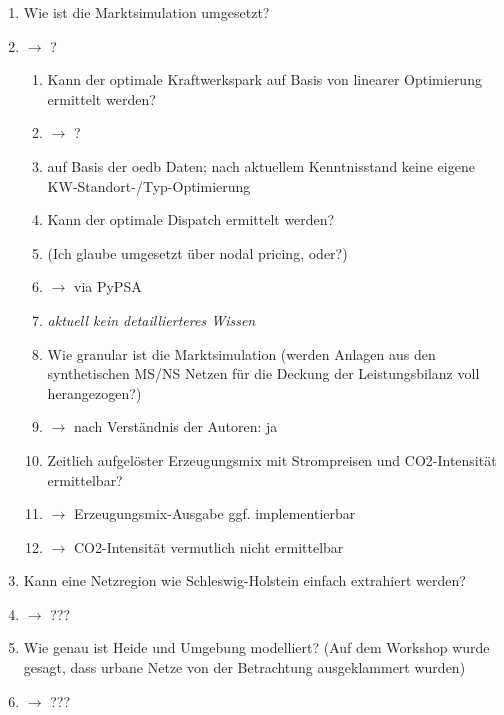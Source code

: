 \documentclass[
a4paper,     %
12pt         %
]{scrartcl}  %
\begin{document}
\begin{enumerate}

%


	\item Wie ist die Marktsimulation umgesetzt?
	\item[] $\rightarrow$ ?
	\begin{enumerate}
		\item Kann der optimale Kraftwerkspark auf Basis von linearer Optimierung ermittelt werden?
		\item[]$\rightarrow$ ?
		\item[] auf Basis der oedb Daten; nach aktuellem Kenntnisstand keine eigene KW-Standort-/Typ-Optimierung

		\item Kann der optimale Dispatch ermittelt werden?
		\item[] (Ich glaube umgesetzt über nodal pricing, oder?)
		\item[]$\rightarrow$ via PyPSA
		\item[] \textit{aktuell kein detaillierteres Wissen}

		\item Wie granular ist die Marktsimulation (werden Anlagen aus den synthetischen MS/NS Netzen für die Deckung der Leistungsbilanz voll herangezogen?)
		\item[]$\rightarrow$ nach Verständnis der Autoren: ja
		\item Zeitlich aufgelöster Erzeugungsmix mit Strompreisen und CO2-Intensität ermittelbar?
		\item[] $\rightarrow$ Erzeugungsmix-Ausgabe ggf. implementierbar
		\item[] $\rightarrow$ CO2-Intensität vermutlich nicht ermittelbar
	\end{enumerate}

	\item  Kann eine Netzregion wie Schleswig-Holstein einfach extrahiert werden?
	\item[] $\rightarrow$ ???
	\item Wie genau ist Heide und Umgebung modelliert? (Auf dem Workshop wurde gesagt, dass urbane Netze von der Betrachtung ausgeklammert wurden)
	\item[] $\rightarrow$ ???


\end{enumerate}
\end{document}
